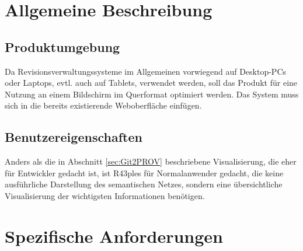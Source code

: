 \documentclass[nocolor]{tudbook}
\begin{document}
\section{Allgemeine Beschreibung}
\subsection{Produktumgebung}
Da Revisionsverwaltungssysteme im Allgemeinen vorwiegend auf Desktop-PCs oder Laptops, evtl. auch auf Tablets, verwendet werden, soll das Produkt für eine Nutzung an einem Bildschirm im Querformat optimiert werden. Das System muss sich in die bereits existierende Weboberfläche einfügen.

\subsection{Benutzereigenschaften}
Anders als die in Abschnitt \ref{sec:Git2PROV} beschriebene Visualisierung, die eher für Entwickler gedacht ist, ist R43ples für Normalanwender gedacht, die keine ausführliche Darstellung des semantischen Netzes, sondern eine übersichtliche Visualisierung der wichtigsten Informationen benötigen. 

\section{Spezifische Anforderungen}
\label{sec:Anforderungen}
\end{document}

